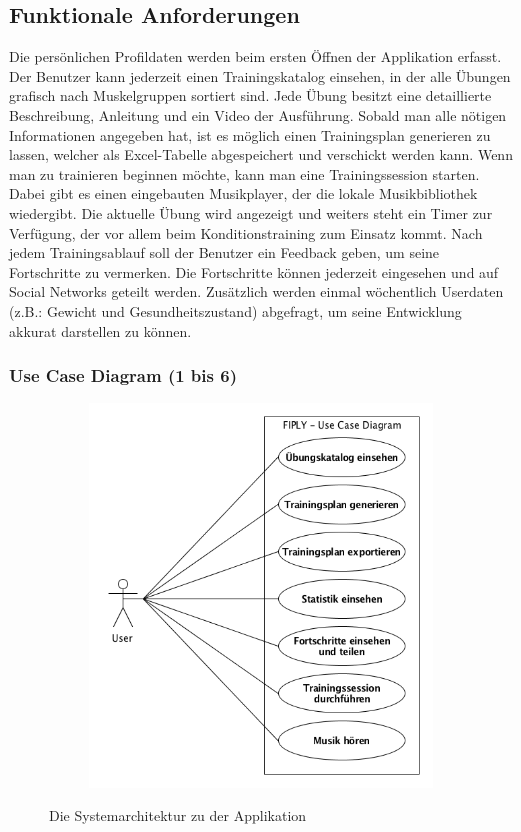 \documentclass[FIPLY_base.tex]{subfiles}
\begin{document}
	\subsection{Funktionale Anforderungen}
	Die persönlichen Profildaten werden beim ersten Öffnen der Applikation erfasst. Der Benutzer kann jederzeit einen Trainingskatalog einsehen, in der alle Übungen grafisch nach Muskelgruppen sortiert sind. Jede Übung besitzt eine detaillierte Beschreibung, Anleitung und ein Video der Ausführung. Sobald man alle nötigen Informationen angegeben hat, ist es möglich einen Trainingsplan generieren zu lassen, welcher  als Excel-Tabelle abgespeichert und verschickt werden kann. Wenn man zu trainieren beginnen möchte, kann man eine Trainingssession starten. Dabei gibt es einen eingebauten Musikplayer, der die lokale Musikbibliothek wiedergibt. Die aktuelle Übung wird angezeigt und weiters steht ein Timer zur Verfügung, der vor allem beim Konditionstraining zum Einsatz kommt. Nach jedem Trainingsablauf soll der Benutzer ein Feedback geben, um seine Fortschritte zu vermerken. Die Fortschritte können jederzeit eingesehen und auf Social Networks geteilt werden. Zusätzlich werden einmal wöchentlich Userdaten (z.B.: Gewicht und Gesundheitszustand) abgefragt, um seine Entwicklung akkurat darstellen zu können.
	\subsubsection{Use Case Diagram (1 bis 6)}
	\begin{figure}[H]
		\begin{subfigure}[b]{0.3\textwidth}
			\centering
			\includegraphics[scale=1]{img/UseCaseDiagram}
		\end{subfigure}
		\caption{Die Systemarchitektur zu der Applikation}
	\end{figure}
	\newpage
\end{document}
